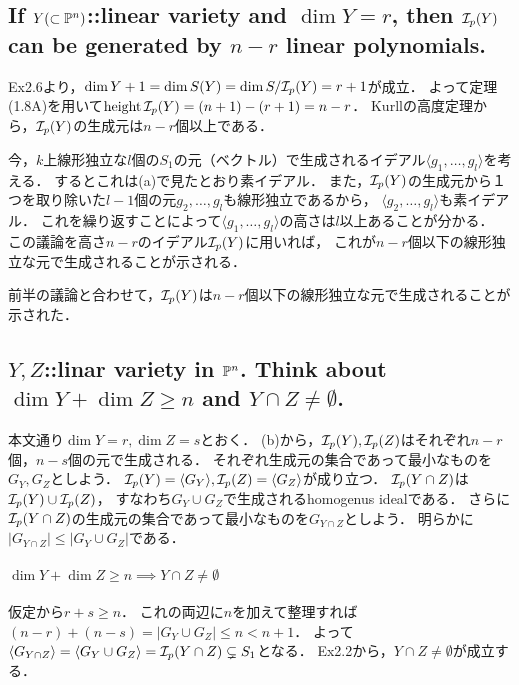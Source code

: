 \documentclass[a4paper]{jsarticle}
\begin{document}
    \subsection{If $Y(\subset \mathbb{P}^n)$::linear variety and $\dim Y=r$, then $\mathcal{I}_p(Y)$ can be generated by $n-r$ linear polynomials.}
    Ex2.6より，$\dim Y+1=\dim S(Y)=\dim S/\mathcal{I}_p(Y)=r+1$が成立．
    よって定理(1.8A)を用いて$\operatorname{height} \mathcal{I}_p(Y)=(n+1)-(r+1)=n-r$．
    Kurllの高度定理から，$\mathcal{I}_p(Y)$の生成元は$n-r$個以上である．

    今，$k$上線形独立な$l$個の$S_1$の元（ベクトル）で生成されるイデアル$\langle g_1, \dots, g_l \rangle$を考える．
    するとこれは(a)で見たとおり素イデアル．
    また，$\mathcal{I}_p(Y)$の生成元から１つを取り除いた$l-1$個の元$g_2, \dots, g_l$も線形独立であるから，
    $\langle g_2, \dots, g_l \rangle$も素イデアル．
    これを繰り返すことによって$\langle g_1, \dots, g_l \rangle$の高さは$l$以上あることが分かる．
    この議論を高さ$n-r$のイデアル$\mathcal{I}_p(Y)$に用いれば，
    これが$n-r$個以下の線形独立な元で生成されることが示される．

    前半の議論と合わせて，$\mathcal{I}_p(Y)$は$n-r$個以下の線形独立な元で生成されることが示された．

    \subsection{$Y, Z$::linar variety in $\mathbb{P}^n$. Think about $\dim Y+\dim Z \geq n$ and $Y \cap Z \neq \emptyset$.}
    本文通り$\dim Y=r, \dim Z=s$とおく．
    (b)から，$\mathcal{I}_p(Y), \mathcal{I}_p(Z)$はそれぞれ$n-r$個，$n-s$個の元で生成される．
    それぞれ生成元の集合であって最小なものを$G_Y, G_Z$としよう．
    $\mathcal{I}_p(Y)=\langle G_Y \rangle, \mathcal{I}_p(Z)=\langle G_Z \rangle$が成り立つ．
    $\mathcal{I}_p(Y \cap Z)$は$\mathcal{I}_p(Y) \cup \mathcal{I}_p(Z)$，
    すなわち$G_Y \cup G_Z$で生成されるhomogenus idealである．
    さらに$\mathcal{I}_p(Y \cap Z)$の生成元の集合であって最小なものを$G_{Y \cap Z}$としよう．
    明らかに$|G_{Y \cap Z}| \leq |G_Y \cup G_Z|$である．

    \paragraph{$\dim Y+\dim Z \geq n \implies Y \cap Z \neq \emptyset$}
    仮定から$r+s \geq n$．
    これの両辺に$n$を加えて整理すれば$(n-r)+(n-s)=|G_Y \cup G_Z| \leq n < n+1$．
    よって$\langle G_{Y \cap Z} \rangle=\langle G_Y \cup G_Z \rangle=\mathcal{I}_p(Y \cap Z) \subsetneq S_1$となる．
    Ex2.2から，$Y \cap Z \neq \emptyset$が成立する．
\end{document}
